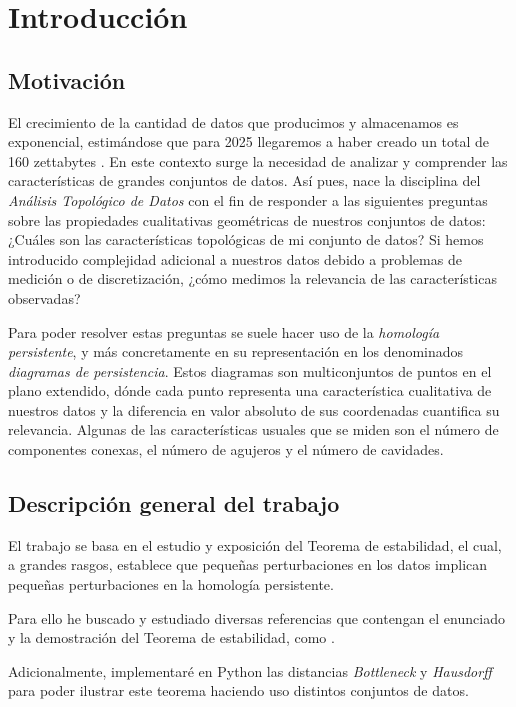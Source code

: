 \chapter{Introducción}

\section{Motivación}
El crecimiento de la cantidad de datos que producimos y almacenamos es exponencial, estimándose que para 2025 llegaremos a haber creado un total de 160 zettabytes \cite{datos2025}. En este contexto surge la necesidad de analizar y comprender las características de grandes conjuntos de datos. Así pues, nace la disciplina del \emph{Análisis Topológico de Datos} con el fin de responder a las siguientes preguntas sobre las propiedades cualitativas geométricas de nuestros conjuntos de datos: ¿Cuáles son las características topológicas de mi conjunto de datos? Si hemos introducido complejidad adicional a nuestros datos debido a problemas de medición o de discretización, ¿cómo medimos la relevancia de las características observadas?

Para poder resolver estas preguntas se suele hacer uso de la \emph{homología persistente}, y más concretamente en su representación en los denominados \emph{diagramas de persistencia}. Estos diagramas son multiconjuntos de puntos en el plano extendido, dónde cada punto representa una característica cualitativa de nuestros datos y la diferencia en valor absoluto de sus coordenadas cuantifica su relevancia. Algunas de las características usuales que se miden son el número de componentes conexas, el número de agujeros y el número de cavidades.

\section{Descripción general del trabajo}
El trabajo se basa en el estudio y exposición del Teorema de estabilidad, el cual, a grandes rasgos, establece que pequeñas perturbaciones en los datos implican pequeñas perturbaciones en la homología persistente.

Para ello he buscado y estudiado diversas referencias que contengan el enunciado y la demostración del Teorema de estabilidad, como \cite{libroEH}  \cite{articuloPersistenciaEH} \cite{Cohen-Steiner2007}.

Adicionalmente, implementaré en Python las distancias \emph{Bottleneck} y \emph{Hausdorff} para poder ilustrar este teorema haciendo uso distintos conjuntos de datos. 

